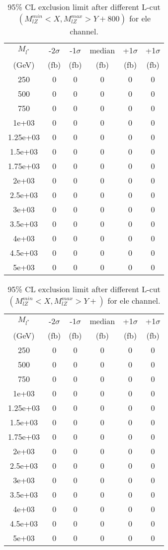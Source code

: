 \documentclass[]{article}
\begin{document}
\begin{table}
\begin{center}
\begin{tabular}{cccccc}
\hline 
\hline 
$M_{l^*}$ & -2$\sigma$ & -1$\sigma$ & median & +1$\sigma$ & +1$\sigma$\\ 
(GeV) & (fb) & (fb) & (fb) & (fb) & (fb)  \\ 
\hline 
\hline 
250 & 0 & 0 & 0 & 0 & 0\\
500 & 0 & 0 & 0 & 0 & 0\\
750 & 0 & 0 & 0 & 0 & 0\\
1e+03 & 0 & 0 & 0 & 0 & 0\\
1.25e+03 & 0 & 0 & 0 & 0 & 0\\
1.5e+03 & 0 & 0 & 0 & 0 & 0\\
1.75e+03 & 0 & 0 & 0 & 0 & 0\\
2e+03 & 0 & 0 & 0 & 0 & 0\\
2.5e+03 & 0 & 0 & 0 & 0 & 0\\
3e+03 & 0 & 0 & 0 & 0 & 0\\
3.5e+03 & 0 & 0 & 0 & 0 & 0\\
4e+03 & 0 & 0 & 0 & 0 & 0\\
4.5e+03 & 0 & 0 & 0 & 0 & 0\\
5e+03 & 0 & 0 & 0 & 0 & 0\\
\hline 
\end{tabular}
\caption{95\% CL exclusion limit after different L-cut $(M_{lZ}^{min} < X, M_{lZ}^{max} > Y + 800)$ for ele channel.}
\label{tab:limit_electron}
\end{center}
\end{table}

\begin{table}
\begin{center}
\begin{tabular}{cccccc}
\hline 
\hline 
$M_{l^*}$ & -2$\sigma$ & -1$\sigma$ & median & +1$\sigma$ & +1$\sigma$\\ 
(GeV) & (fb) & (fb) & (fb) & (fb) & (fb)  \\ 
\hline 
\hline 
250 & 0 & 0 & 0 & 0 & 0\\
500 & 0 & 0 & 0 & 0 & 0\\
750 & 0 & 0 & 0 & 0 & 0\\
1e+03 & 0 & 0 & 0 & 0 & 0\\
1.25e+03 & 0 & 0 & 0 & 0 & 0\\
1.5e+03 & 0 & 0 & 0 & 0 & 0\\
1.75e+03 & 0 & 0 & 0 & 0 & 0\\
2e+03 & 0 & 0 & 0 & 0 & 0\\
2.5e+03 & 0 & 0 & 0 & 0 & 0\\
3e+03 & 0 & 0 & 0 & 0 & 0\\
3.5e+03 & 0 & 0 & 0 & 0 & 0\\
4e+03 & 0 & 0 & 0 & 0 & 0\\
4.5e+03 & 0 & 0 & 0 & 0 & 0\\
5e+03 & 0 & 0 & 0 & 0 & 0\\
\hline 
\end{tabular}
\caption{95\% CL exclusion limit after different L-cut $(M_{lZ}^{min} < X, M_{lZ}^{max} > Y +  )$ for ele channel.}
\label{tab:limit_electron}
\end{center}
\end{table}
\end{document}
